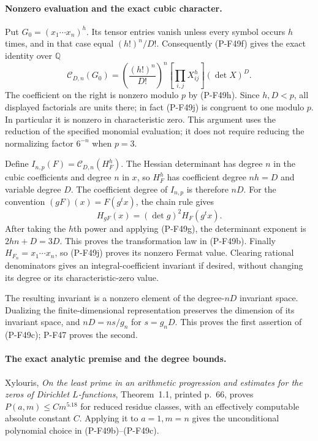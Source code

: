 \documentclass[11pt,a4paper]{article}
\begin{document}
\paragraph{Nonzero evaluation and the exact cubic character.}
Put $G_0=(x_1\cdots x_n)^h$. Its tensor entries vanish
unless every symbol occurs $h$ times, and in that case
equal $(h!)^n/D!$. Consequently (P-F49f) gives the exact
identity over $\mathbb Q$
\[
 \mathcal C_{D,n}(G_0)
       =\left(\frac{(h!)^n}{D!}\right)^n
              [\prod_{i,j}X_{ij}^{h}](\det X)^D.
                                                        \tag{P-F49j}
\]
The coefficient on the right is nonzero modulo $p$
by (P-F49h). Since $h,D<p$, all displayed factorials
are units there; in fact (P-F49j) is congruent to one
modulo $p$. In particular it is nonzero in characteristic
zero. This argument uses the reduction of the specified
monomial evaluation; it does not require reducing the
normalizing factor $6^{-n}$ when $p=3$.

Define $I_{n,p}(F)=\mathcal C_{D,n}(H_F^h)$.
The Hessian determinant has degree $n$ in the cubic
coefficients and degree $n$ in $x$, so $H_F^h$ has
coefficient degree $nh=D$ and variable degree $D$.
The coefficient degree of $I_{n,p}$ is therefore $nD$.
For the convention $(gF)(x)=F(g^t x)$, the chain rule
gives
\[
            H_{gF}(x)=(\det g)^2H_F(g^t x).
                                                        \tag{P-F49k}
\]
After taking the $h$th power and applying (P-F49g),
the determinant exponent is $2hn+D=3D$. This proves
the transformation law in (P-F49b). Finally
$H_{F_n}=x_1\cdots x_n$, so (P-F49j) proves its nonzero
Fermat value. Clearing rational denominators gives an
integral-coefficient invariant if desired, without
changing its degree or its characteristic-zero value.

The resulting invariant is a nonzero element of the
degree-$nD$ invariant space. Dualizing the finite-dimensional
representation preserves the dimension of its invariant
space, and $nD=ns/g_n$ for $s=g_nD$. This proves the
first assertion of (P-F49c); P-F47 proves the second.

\paragraph{The exact analytic premise and the degree bounds.}
Xylouris, \emph{On the least prime in an arithmetic
progression and estimates for the zeros of Dirichlet
$L$-functions}, Theorem~1.1, printed p.~66, proves
$P(a,m)\le C m^{5.18}$ for reduced residue classes,
with an effectively computable absolute constant $C$.
Applying it to $a=1,m=n$ gives the unconditional
polynomial choice in (P-F49b)--(P-F49c).
\end{document}
